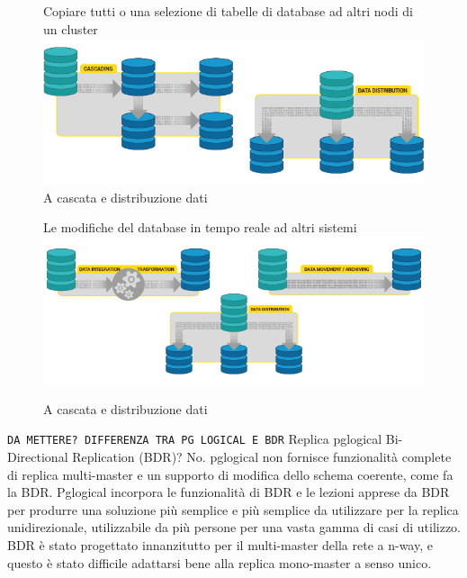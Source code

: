 \begin{figure}[htbp]
\centering
Copiare tutti o una selezione di tabelle di database ad altri nodi di un cluster
\includegraphics[scale=0.70]{img/pglogical_3.png}\\
\caption{A cascata e distribuzione dati \label{figura3} \cite{etichetta2}}
Le modifiche del database in tempo reale ad altri sistemi
\includegraphics[scale=0.70]{img/pglogical_4.png}\\
\caption{A cascata e distribuzione dati \label{figura4} \cite{etichetta2}}
\end{figure}

\texttt{DA METTERE? DIFFERENZA TRA PG LOGICAL E BDR}
Replica pglogical Bi-Directional Replication (BDR)?
No. pglogical non fornisce funzionalità complete di replica multi-master e un supporto di modifica dello schema coerente, come fa la BDR. Pglogical incorpora le funzionalità di BDR e le lezioni apprese da BDR per produrre una soluzione più semplice e più semplice da utilizzare per la replica unidirezionale, utilizzabile da più persone per una vasta gamma di casi di utilizzo. BDR è stato progettato innanzitutto per il multi-master della rete a n-way, e questo è stato difficile adattarsi bene alla replica mono-master a senso unico.
%

